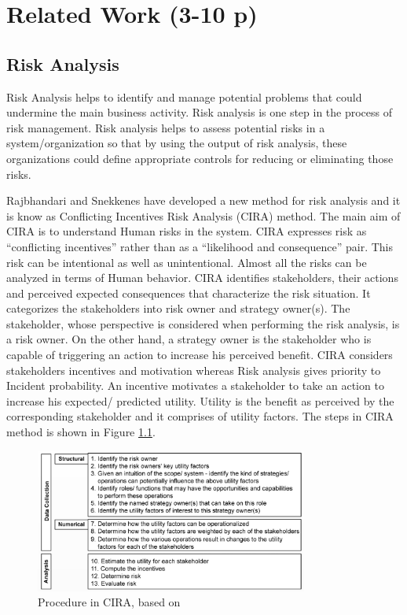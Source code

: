 \documentclass[a4paper,twoside,10pt]{report}
\begin{document}
\chapter{Related Work (3-10 p)}\label{relWork}

\section{Risk Analysis}\label{risk_analysis}

Risk Analysis helps to identify and manage potential problems that could undermine the main business activity. Risk analysis is one step in the process of risk management. Risk analysis helps to assess potential risks in a system/organization so that by using the output of risk analysis, these organizations could define appropriate controls for reducing or eliminating those risks. 

Rajbhandari and Snekkenes \cite{lisaB} have developed a new method for risk analysis and it is know as Conflicting Incentives Risk Analysis (CIRA) method. The main aim of CIRA is to understand Human risks in the system. CIRA expresses risk as ``conflicting incentives'' rather than as a ``likelihood and consequence'' pair. This risk can be intentional as well as unintentional. Almost all the risks can be analyzed in terms of Human behavior. CIRA identifies stakeholders, their actions and perceived expected consequences that characterize the risk situation. It categorizes the stakeholders into risk owner and strategy owner(s). The stakeholder, whose perspective is considered when performing the risk analysis, is a risk owner. On the other hand, a strategy owner is the stakeholder who is capable of triggering an action to increase his perceived benefit. CIRA considers stakeholders incentives and motivation whereas Risk analysis gives priority to Incident probability. An incentive motivates a stakeholder to take an action to increase his expected/ predicted utility. Utility is the benefit as perceived by the corresponding stakeholder and it comprises of utility factors. The steps in CIRA method is shown in Figure \ref{fig:CIRA_process}. 

\begin{figure}[H]
	\centering
  \includegraphics[width=0.8\textwidth]{Figure/CIRA_process.jpg}
  \caption{Procedure in CIRA, based on \cite{lisathesis}}
  \label{fig:CIRA_process}
\end{figure}
\end{document}
